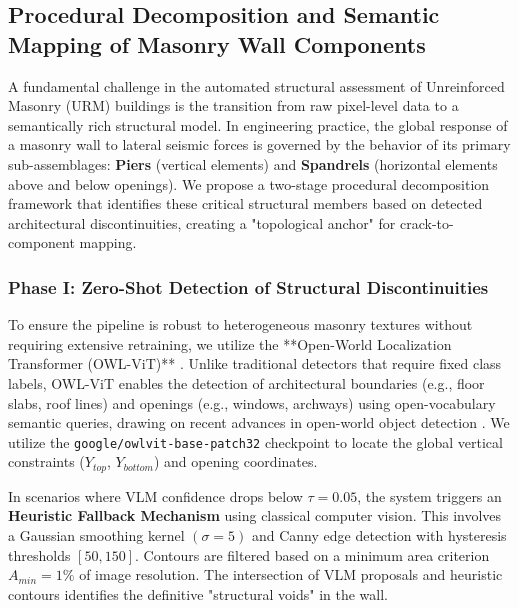 \subsection{Procedural Decomposition and Semantic Mapping of Masonry Wall Components}
\label{sec:wall_decomposition}

\begin{sloppypar}
A fundamental challenge in the automated structural assessment of Unreinforced Masonry (URM) buildings is the transition from raw pixel-level data to a semantically rich structural model. In engineering practice, the global response of a masonry wall to lateral seismic forces is governed by the behavior of its primary sub-assemblages: \textbf{Piers} (vertical elements) and \textbf{Spandrels} (horizontal elements above and below openings). We propose a two-stage procedural decomposition framework that identifies these critical structural members based on detected architectural discontinuities, creating a "topological anchor" for crack-to-component mapping.
\end{sloppypar}

\subsubsection{Phase I: Zero-Shot Detection of Structural Discontinuities}
\begin{sloppypar}
To ensure the pipeline is robust to heterogeneous masonry textures without requiring extensive retraining, we utilize the **Open-World Localization Transformer (OWL-ViT)** \cite{owlvit}. Unlike traditional detectors that require fixed class labels, OWL-ViT enables the detection of architectural boundaries (e.g., floor slabs, roof lines) and openings (e.g., windows, archways) using open-vocabulary semantic queries, drawing on recent advances in open-world object detection \cite{mindermann2023open}. We utilize the \texttt{google/owlvit-base-patch32} checkpoint to locate the global vertical constraints ($Y_{top}$, $Y_{bottom}$) and opening coordinates.
\end{sloppypar}

\begin{sloppypar}
In scenarios where VLM confidence drops below $\tau=0.05$, the system triggers an \textbf{Heuristic Fallback Mechanism} using classical computer vision. This involves a Gaussian smoothing kernel $(\sigma=5)$ and Canny edge detection with hysteresis thresholds $[50, 150]$. Contours are filtered based on a minimum area criterion $A_{min} = 1\%$ of image resolution. The intersection of VLM proposals and heuristic contours identifies the definitive "structural voids" in the wall.
\end{sloppypar}

